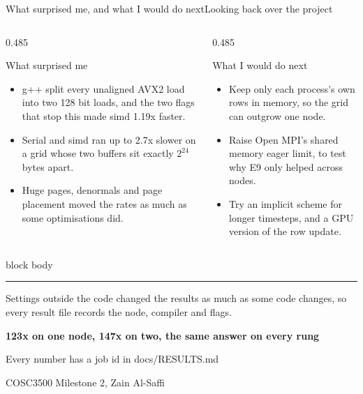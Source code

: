 \documentclass[aspectratio=169,11pt]{beamer}
\newcommand{\xMpiOne}{123}
\newcommand{\xMpiTwo}{147}
\newcommand{\splitGainOne}{1.19}
\newcommand{\sigcallout}[1]{%
  \vfill
  \begin{beamercolorbox}[wd=0.74\linewidth,sep=0.55em,rounded=true]{block body}
    \small{\color{sigblue}\rule{0.9ex}{0.9ex}}\hspace{0.5em}#1
  \end{beamercolorbox}%
}
\begin{document}
\begin{frame}{What surprised me, and what I would do next}{Looking back over the project}
  \begin{columns}[T,onlytextwidth]
    \begin{column}{0.485\textwidth}
      \begin{block}{What surprised me}
        \small
        \begin{itemize}
          \item g++ split every unaligned AVX2 load into two 128 bit loads, and the two flags that stop this made simd \splitGainOne x faster.
          \item Serial and simd ran up to 2.7x slower on a grid whose two buffers sit exactly $2^{24}$ bytes apart.
          \item Huge pages, denormals and page placement moved the rates as much as some optimisations did.
        \end{itemize}
      \end{block}
    \end{column}
    \begin{column}{0.485\textwidth}
      \begin{block}{What I would do next}
        \small
        \begin{itemize}
          \item Keep only each process's own rows in memory, so the grid can outgrow one node.
          \item Raise Open MPI's shared memory eager limit, to test why E9 only helped across nodes.
          \item Try an implicit scheme for longer timesteps, and a GPU version of the row update.
        \end{itemize}
      \end{block}
    \end{column}
  \end{columns}
  \sigcallout{Settings outside the code changed the results as much as some
    code changes, so every result file records the node, compiler and flags.}
\end{frame}

\begin{frame}[plain]
  \vfill
  \centering
  {\Large\color{sigink}\bfseries \xMpiOne x on one node, \xMpiTwo x on two,
    the same answer on every rung}
  \par\vspace{0.6em}
  {\color{sigslate} Every number has a job id in docs/RESULTS.md}
  \par\vspace{0.3em}
  {\color{sigslate} COSC3500 Milestone 2, Zain Al-Saffi}
  \vfill
\end{frame}
\end{document}
